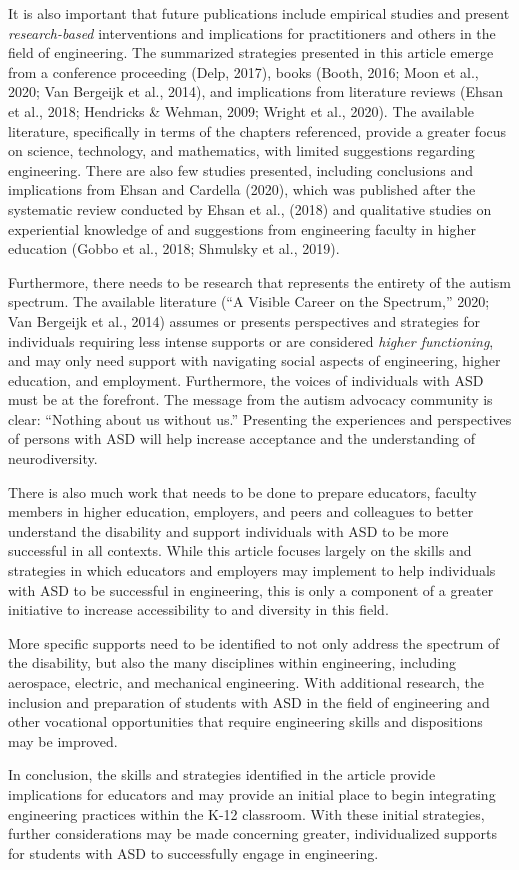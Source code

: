 \documentclass[11.5pt]{sig-alternate}
\begin{document}
\begin{large}
It is also important that future publications include empirical studies and present \textit{research-based} interventions and implications for practitioners and others in the field of engineering. The summarized strategies presented in this article emerge from a conference proceeding (Delp, 2017), books (Booth, 2016; Moon et al., 2020; Van Bergeijk et al., 2014), and implications from literature reviews (Ehsan et al., 2018; Hendricks \& Wehman, 2009; Wright et al., 2020). The available literature, specifically in terms of the chapters referenced, provide a greater focus on science, technology, and mathematics, with limited suggestions regarding engineering. There are also few studies presented, including conclusions and implications from Ehsan and Cardella (2020), which was published after the systematic review conducted by Ehsan et al., (2018) and qualitative studies on experiential knowledge of and suggestions from engineering faculty in higher education (Gobbo et al., 2018; Shmulsky et al., 2019). 

Furthermore, there needs to be research that represents the entirety of the autism spectrum. The available literature (“A Visible Career on the Spectrum,” 2020; Van Bergeijk et al., 2014) assumes or presents perspectives and strategies for individuals requiring less intense supports or are considered \textit{higher functioning}, and may only need support with navigating social aspects of engineering, higher education, and employment. Furthermore, the voices of individuals with ASD must be at the forefront. The message from the autism advocacy community is clear: “Nothing about us without us.” Presenting the experiences and perspectives of persons with ASD will help increase acceptance and the understanding of neurodiversity. 

There is also much work that needs to be done to prepare educators, faculty members in higher education, employers, and peers and colleagues to better understand the disability and support individuals with ASD to be more successful in all contexts. While this article focuses largely on the skills and strategies in which educators and employers may implement to help individuals with ASD to be successful in engineering, this is only a component of a greater initiative to increase accessibility to and diversity in this field.

More specific supports need to be identified to not only address the spectrum of the disability, but also the many disciplines within engineering, including aerospace, electric, and mechanical engineering. With additional research, the inclusion and preparation of students with ASD in the field of engineering and other vocational opportunities that require engineering skills and dispositions may be improved. 

In conclusion, the skills and strategies identified in the article provide implications for educators and may provide an initial place to begin integrating engineering practices within the K-12 classroom. With these initial strategies, further considerations may be made concerning greater, individualized supports for students with ASD to successfully engage in engineering. 

\end{large}
 
\end{document}
